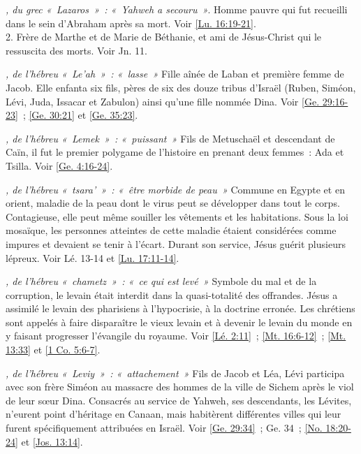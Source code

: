 \begin{multicols}{2}
\textit{, du grec «~Lazaros~»~: «~Yahweh a secouru~»}. Homme pauvre qui fut recueilli dans le sein d'Abraham après sa mort. Voir \vref{Lu. 16:19-21}.
\\2. Frère de Marthe et de Marie de Béthanie, et ami de Jésus-Christ qui le ressuscita des morts. Voir Jn. 11.

\textit{, de l'hébreu «~Le'ah~»~: «~lasse~»}\newline
Fille aînée de Laban et première femme de Jacob. Elle enfanta six fils, pères de six des douze tribus d'Israël (Ruben, Siméon, Lévi, Juda, Issacar et Zabulon) ainsi qu'une fille nommée Dina. Voir \vref{Ge. 29:16-23}~; \vref{Ge. 30:21} et \vref{Ge. 35:23}.

\textit{, de l'hébreu «~Lemek~»~: «~puissant~»}\newline
Fils de Metuschaël et descendant de Caïn, il fut le premier polygame de l'histoire en prenant deux femmes~: Ada et Tsilla. Voir \vref{Ge. 4:16-24}.

\textit{, de l'hébreu «~tsara'~»~: «~être morbide de peau~»}\newline
Commune en Egypte et en orient, maladie de la peau dont le virus peut se développer dans tout le corps. Contagieuse, elle peut même souiller les vêtements et les habitations. Sous la loi mosaïque, les personnes atteintes de cette maladie étaient considérées comme impures et devaient se tenir à l'écart. Durant son service, Jésus guérit plusieurs lépreux. Voir Lé. 13-14 et \vref{Lu. 17:11-14}.

\textit{, de l'hébreu «~chametz~»~: «~ce qui est levé~»}\newline
Symbole du mal et de la corruption, le levain était interdit dans la quasi-totalité des offrandes. Jésus a assimilé le levain des pharisiens à l'hypocrisie, à la doctrine erronée. Les chrétiens sont appelés à faire disparaître le vieux levain et à devenir le levain du monde en y faisant progresser l'évangile du royaume. Voir \vref{Lé. 2:11}~; \vref{Mt. 16:6-12}~; \vref{Mt. 13:33} et \vref{1 Co. 5:6-7}.

\textit{, de l'hébreu «~Leviy~»~: «~attachement~»}\newline
Fils de Jacob et Léa, Lévi participa avec son frère Siméon au massacre des hommes de la ville de Sichem après le viol de leur sœur Dina. Consacrés au service de Yahweh, ses descendants, les Lévites, n'eurent point d'héritage en Canaan, mais habitèrent différentes villes qui leur furent spécifiquement attribuées en Israël. Voir \vref{Ge. 29:34}~; Ge. 34~; \vref{No. 18:20-24} et \vref{Jos. 13:14}.


\end{multicols}
